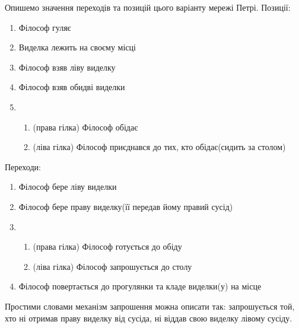 Опишемо значення переходів та позицій цього варіанту мережі Петрі.
Позиції:
\begin{enumerate}
    \item Філософ гуляє
    \item Виделка лежить на своєму місці
    \item Філософ взяв ліву виделку
    \item Філософ взяв обидві виделки
    \item \begin{enumerate}
        \item (права гілка) Філософ обідає
        \item (ліва гілка) Філософ приєднався до тих, кто обідає(сидить за столом)
    \end{enumerate}
\end{enumerate}

Переходи:
\begin{enumerate}
    \item Філософ бере ліву виделки
    \item Філософ бере праву виделку(її передав йому правий сусід)
    \item \begin{enumerate}
        \item (права гілка) Філософ готується до обіду
        \item (ліва гілка) Філософ запрошується до столу
    \end{enumerate}
    \item Філософ повертається до прогулянки та кладе виделки(у) на місце
\end{enumerate}

Простими словами механізм запрошення можна описати так: запрошується той, хто
ні отримав праву виделку від сусіда, ні віддав свою виделку лівому сусіду.